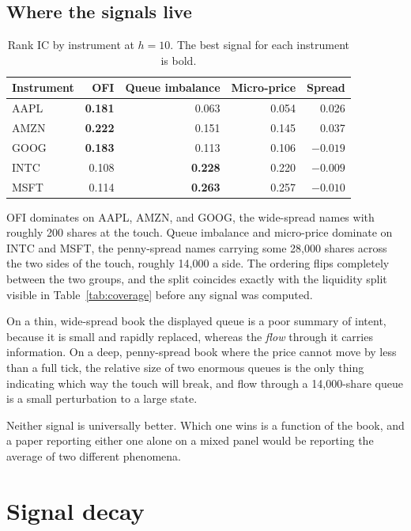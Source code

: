 \documentclass[11pt]{scrartcl}
\begin{document}
\subsection{Where the signals live}
\label{sec:where}

\begin{table}[H]
\centering
\caption{Rank IC by instrument at $h=10$. The best signal for each instrument is bold.}
\label{tab:byinstrument}
\begin{tabular}{lrrrr}
\toprule
Instrument & OFI & Queue imbalance & Micro-price & Spread \\
\midrule
AAPL & \textbf{0.181} & 0.063 & 0.054 & 0.026 \\
AMZN & \textbf{0.222} & 0.151 & 0.145 & 0.037 \\
GOOG & \textbf{0.183} & 0.113 & 0.106 & $-0.019$ \\
INTC & 0.108 & \textbf{0.228} & 0.220 & $-0.009$ \\
MSFT & 0.114 & \textbf{0.263} & 0.257 & $-0.010$ \\
\bottomrule
\end{tabular}
\end{table}

OFI dominates on AAPL, AMZN, and GOOG, the wide-spread names with roughly 200 shares at the touch. Queue imbalance and micro-price dominate on INTC and MSFT, the penny-spread names carrying some 28{,}000 shares across the two sides of the touch, roughly 14{,}000 a side. The ordering flips completely between the two groups, and the split coincides exactly with the liquidity split visible in Table~\ref{tab:coverage} before any signal was computed.

On a thin, wide-spread book the displayed queue is a poor summary of intent, because it is small and rapidly replaced, whereas the \emph{flow} through it carries information. On a deep, penny-spread book where the price cannot move by less than a full tick, the relative size of two enormous queues is the only thing indicating which way the touch will break, and flow through a 14{,}000-share queue is a small perturbation to a large state.

Neither signal is universally better. Which one wins is a function of the book, and a paper reporting either one alone on a mixed panel would be reporting the average of two different phenomena.

\section{Signal decay}
\label{sec:decay}
\end{document}
